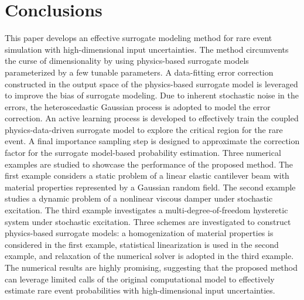 \documentclass[number,preprint,3p]{elsarticle}
\newcommand{\1}[2]{\mathbb{I}_{#1}\left(#2\right)}
\begin{document}
	\section{Conclusions}\label{Sec:conclude}
	\noindent This paper develops an effective surrogate modeling method for rare event simulation with high-dimensional input uncertainties. The method circumvents the curse of dimensionality by using physics-based surrogate models parameterized by a few tunable parameters. A data-fitting error correction constructed in the output space of the physics-based surrogate model is leveraged to improve the bias of surrogate modeling. Due to inherent stochastic noise in the errors, the heteroscedastic Gaussian process is adopted to model the error correction. An active learning process is developed to effectively train the coupled physics-data-driven surrogate model to explore the critical region for the rare event. A final importance sampling step is designed to approximate the correction factor for the surrogate model-based probability estimation. Three numerical examples are studied to showcase the performance of the proposed method. The first example considers a static problem of a linear elastic cantilever beam with material properties represented by a Gaussian random field. The second example studies a dynamic problem of a nonlinear viscous damper under stochastic excitation. The third example investigates a multi-degree-of-freedom hysteretic system under stochastic excitation. Three schemes are investigated to construct physics-based surrogate models: a homogenization of material properties is considered in the first example, statistical linearization is used in the second example, and relaxation of the numerical solver is adopted in the third example. The numerical results are highly promising, suggesting that the proposed method can leverage limited calls of the original computational model to effectively estimate rare event probabilities with high-dimensional input uncertainties.  
	
	
	
\end{document}
